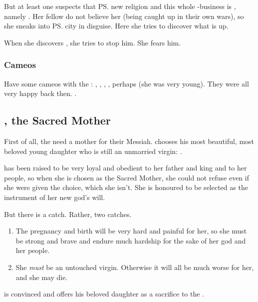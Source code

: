 But at least one \dragon{} suspects that \ps{\Semiza} new religion and this whole \Thanatzil-business is , namely . 
Her fellow \dragons{} do not believe her (being caught up in their own wars), so she sneaks into \ps{\Semiza} city in disguise. 
Here she tries to discover what is up. 

When she discovers \Thanatzil, she tries to stop him. 
She fears him. 





\subsubsection{Cameos}
Have some cameos with the \dragons{}: 
\Nexagglachel, \Ishnaruchaefir, \Secherdamon, \Triestessakhin, perhaps \Nzessuacrith{} (she was very young). 
They were all very happy back then. 
. 









\subsection{\Ilu, the Sacred Mother}
First of all, the \banes{} need a mother for their Messiah. \Semiza{} chooses his most beautiful, most beloved young daughter who is still an unmarried virgin: . 

\Ilu{} has been raised to be very loyal and obedient to her father and king and to her people, so when she is chosen as the Sacred Mother, she could not refuse even if she were given the choice, which she isn't. She is honoured to be selected as the instrument of her new god's will. 

But there is a catch. Rather, two catches. 

\begin{enumerate}
  \item 
    The pregnancy and birth will be very hard and painful for her, so she must be strong and brave and endure much hardship for the sake of her god and her people.
  \item
    She \emph{must} be an untouched virgin. Otherwise it will all be much worse for her, and she may die.
\end{enumerate}

\Semiza{} is convinced and offers his beloved daughter as a sacrifice to the \banes. 

